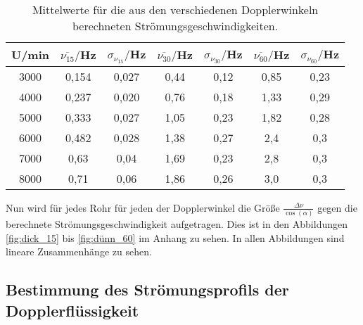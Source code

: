\begin{table}[htp]
	\begin{center}
    \caption{Mittelwerte für die aus den verschiedenen Dopplerwinkeln berechneten
    Strömungsgeschwindigkeiten.}
    \label{tab:mittelwerte}
		\begin{tabular}{ccccccc}
		\toprule
			{U/min} & {$\overline{\nu_{15}}/$Hz} & {$\sigma_{{\nu_{15}}}/$Hz} &
      {$\overline{\nu_{30}}/$Hz} & {$\sigma_{{\nu_{30}}}/$Hz} &
      {$\overline{\nu_{60}}/$Hz} & {$\sigma_{{\nu_{60}}}/$Hz}\\
			\midrule
			3000 & 0,154 & 0,027 & 0,44 & 0,12 & 0,85 & 0,23\\
			4000 & 0,237 & 0,020 & 0,76 & 0,18 & 1,33 & 0,29\\
			5000 & 0,333 & 0,027 & 1,05 & 0,23 & 1,82 & 0,28\\
			6000 & 0,482 & 0,028 & 1,38 & 0,27 & 2,4 & 0,3\\
			7000 & 0,63  & 0,04 & 1,69 & 0,23 & 2,8 & 0,3\\
			8000 & 0,71  & 0,06 & 1,86 & 0,26 & 3,0 & 0,3\\
		\bottomrule
		\end{tabular}
	\end{center}
\end{table}

Nun wird für jedes Rohr für jeden der Dopplerwinkel die Größe $\frac{\Delta \nu}{\cos(\alpha)}$
gegen die berechnete Strömungsgeschwindigkeit aufgetragen. Dies ist in den Abbildungen
\ref{fig:dick_15} bis \ref{fig:dünn_60} im Anhang zu sehen. In allen Abbildungen sind
lineare Zusammenhänge zu sehen.

\subsection{Bestimmung des Strömungsprofils der Dopplerflüssigkeit}
\label{subsec:strömungsprofil}
